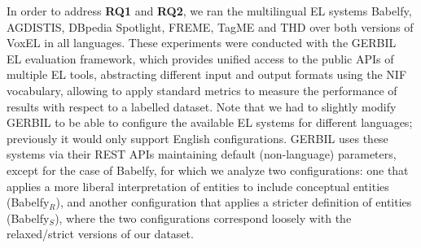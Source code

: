 \documentclass{llncs}
\begin{document}
In order to address \textbf{RQ1} and \textbf{RQ2}, we ran the multilingual EL systems Babelfy, AGDISTIS, DBpedia Spotlight, FREME, TagME and THD over both versions of VoxEL in all languages. These experiments were conducted with the GERBIL~\cite{gerbil-2015} EL evaluation framework, which provides unified access to the public APIs of multiple EL tools, abstracting different input and output formats using the NIF vocabulary, allowing to apply standard metrics to measure the performance of results with respect to a labelled dataset. Note that we had to slightly modify GERBIL to be able to configure the available EL systems for different languages; previously it would only support English configurations. GERBIL uses these systems via their REST APIs maintaining default (non-language) parameters, except for the case of Babelfy, for which we analyze two configurations: one that applies a more liberal interpretation of entities to include conceptual entities (Babelfy$_R$), and another configuration that applies a stricter definition of entities (Babelfy$_S$), where the two configurations correspond loosely with the relaxed/strict versions of our dataset.


\newcommand{\bl}[1]{\textbf{#1}}
\end{document}
